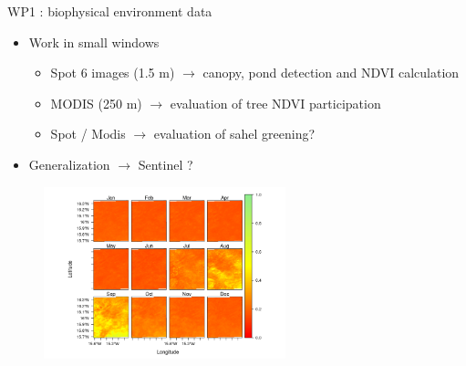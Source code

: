 \documentclass[newPxFont]{beamer}
\begin{document}
\begin{frame}[c]{WP1 : biophysical environment data}
\vspace{-2em}
\begin{itemize}
  \item Work in small windows
  \begin{itemize}
    \item Spot 6 images (1.5 m) $\rightarrow$ canopy, pond detection and NDVI calculation
    \item MODIS (250 m) $\rightarrow$ evaluation of tree NDVI participation
    \item Spot / Modis $\rightarrow$ evaluation of sahel greening?
  \end{itemize}
  \item Generalization $\rightarrow$ Sentinel ?
\end{itemize}
\vspace{-1em}
\begin{figure}
	\centering
	\includegraphics[width = 7cm]{img/NDVI2015}
\end{figure}
\end{frame}

\end{document}
